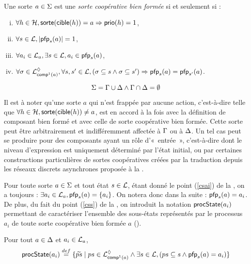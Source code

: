 \begin{definition}
  Une sorte $a \in \PHs$ est une \emph{sorte coopérative bien formée} si et seulement si :
  \begin{enumerate}[(i)]
    \item $\forall h \in \PHh, \sort{\target{h}} = a \Rightarrow \prio(h) = 1$,
    \item \label{csai} $\forall s \in \PHl, \card{\pfp_s(a)} = 1$,
    \item \label{css} $\forall a_i \in \PHl_a, \exists s \in \PHl, a_i \in \pfp_s(a)$,
    \item $\forall \mysigma \in \PHsubl[\PHl]_{\compin(a)}, \forall s, s' \in \PHl,
        (\mysigma \subseteq s \wedge \mysigma \subseteq s') \Rightarrow \pfp_s(a) = \pfp_{s'}(a)$.
  \end{enumerate}
\end{definition}

\begin{condition}
  \[\PHs = \components \cup \cs \wedge \components \cap \cs = \emptyset\]
\end{condition}

Il est à noter qu'une sorte $a$ qui n'est frappée par aucune action,
c'est-à-dire telle que $\forall h \in \PHh, \sort{\target{h}} \neq a$,
est en accord à la fois avec la définition de composant bien formé
et avec celle de sorte coopérative bien formée.
Cette sorte peut être arbitrairement et indifféremment affectée à $\components$ ou à $\cs$.
Un tel cas peut se produire pour des composants ayant un rôle d'«~entrée~»,
c'est-à-dire dont le niveau d'expression est uniquement déterminé par l'état initial,
ou par certaines constructions particulières de sortes coopératives créées par la traduction
depuis les réseaux discrets asynchrones proposée à la .

Pour toute sorte $a \in \PHs$ et tout état $s \in \PHl$,
étant donné le point (\ref{csai}) de la , on a toujours :
$\exists a_i \in \PHl_a, \pfp_s(a) = \{ a_i \}$.
On notera donc dans la suite : $\pfp_s(a) = a_i$.
De plus, du fait du point (\ref{css}) de la , on introduit la notation
$\csState(a_i)$ permettant de caractériser l'ensemble des sous-états représentés par le
processus $a_i$ de toute sorte coopérative bien formée $a$ ().

\begin{definition}[$\csState : \PHproc \rightarrow \powerset(\PHproc)$]
\label{def:csState}
  Pour tout $a \in \cs$ et $a_i \in \PHl_a$, 
    \[\csState(a_i) \DEF \{ \toset{ps} \mid ps \in \PHsubl[\PHl]_{\compin(a)} \wedge
      \exists s \in \PHl, (ps \subseteq s \wedge \pfp_s(a) = a_i) \}\]
\end{definition}

